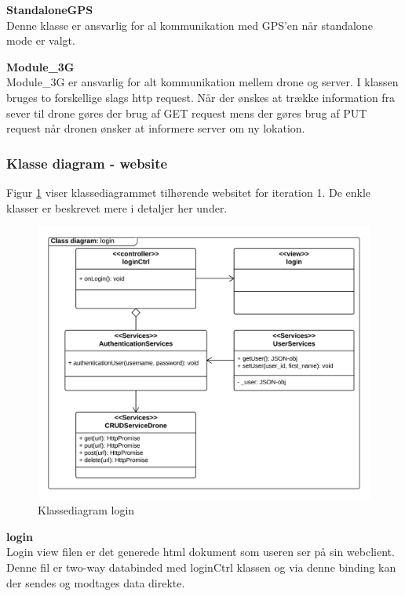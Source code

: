 \textbf{StandaloneGPS}\\
Denne klasse er ansvarlig for al kommunikation med GPS'en når standalone mode er valgt. 

\textbf{Module\_3G} \\
Module\_3G er ansvarlig for alt kommunikation mellem drone og server. I klassen bruges to forskellige slags http request. Når der ønskes at trække information fra sever til drone gøres der brug af GET request mens der gøres brug af PUT request når dronen ønsker at informere server om ny lokation.

\newpage

\subsubsection*{Klasse diagram - website}
\vspace{-0.1cm}
Figur \ref{fig:classDiagram_login} viser klassediagrammet tilhørende websitet for iteration 1. De enkle klasser er beskrevet mere i detaljer her under.
\begin{figure}[H]
	\centering
	\includegraphics[width=1\textwidth]{Billeder/klasse_diagrammer/login_class_diagram.png}
	\vspace{-0.5cm}
	\caption{Klassediagram login}
	\label{fig:classDiagram_login}
\end{figure}

\newpage

\textbf{login} \\
Login view filen er det generede html dokument som useren ser på sin webclient. Denne fil er two-way databinded med loginCtrl klassen og via denne binding kan der sendes og modtages data direkte.


